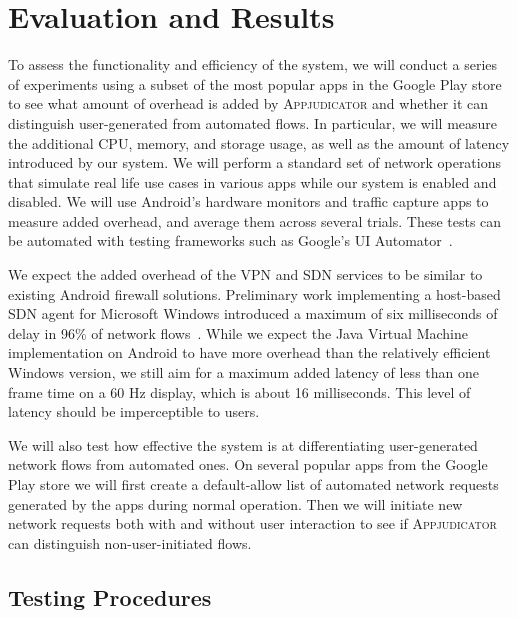\section{Evaluation and Results}
\label{sec:evaluation-and-results}


To assess the functionality and efficiency of the system, we will conduct a series of experiments using a subset of the most popular apps in the Google Play store to see what amount of overhead is added by \textsc{Appjudicator} and whether it can distinguish user-generated from automated flows. In particular, we will measure the additional CPU, memory, and storage usage, as well as the amount of latency introduced by our system. We will perform a standard set of network operations that simulate real life use cases in various apps while our system is enabled and disabled. We will use Android's hardware monitors and traffic capture apps to measure added overhead, and average them across several trials. These tests can be automated with testing frameworks such as Google's UI Automator~\cite{uiautomator2020}.

We expect the added overhead of the VPN and SDN services to be similar to existing Android firewall solutions. Preliminary work implementing a host-based SDN agent for Microsoft Windows introduced a maximum of six milliseconds of delay in 96\% of network flows~\cite{chuluundorj2019}. While we expect the Java Virtual Machine implementation on Android to have more overhead than the relatively efficient Windows version, we still aim for a maximum added latency of less than one frame time on a 60 Hz display, which is about 16 milliseconds. This level of latency should be imperceptible to users.

We will also test how effective the system is at differentiating user-generated network flows from automated ones. On several popular apps from the Google Play store we will first create a default-allow list of automated network requests generated by the apps during normal operation. Then we will initiate new network requests both with and without user interaction to see if \textsc{Appjudicator} can distinguish non-user-initiated flows.


\subsection{Testing Procedures}
\label{sec:testing-procedures}

